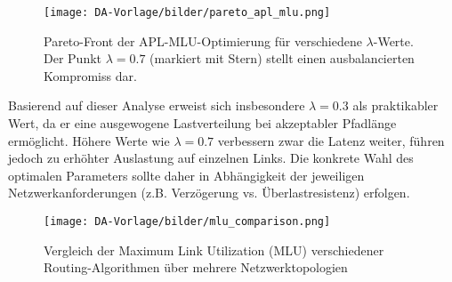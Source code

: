 \begin{figure}[htbp]
    \centering
    \texttt{[image: DA-Vorlage/bilder/pareto\_apl\_mlu.png]}
    \caption{Pareto-Front der APL-MLU-Optimierung für verschiedene $\lambda$-Werte. Der Punkt $\lambda = 0.7$ (markiert mit Stern) stellt einen ausbalancierten Kompromiss dar.}
    \label{fig:pareto_apl_mlu}
\end{figure}

Basierend auf dieser Analyse erweist sich insbesondere $\lambda = 0.3$ als praktikabler Wert, da er eine ausgewogene Lastverteilung bei akzeptabler Pfadlänge ermöglicht. Höhere Werte wie $\lambda = 0.7$ verbessern zwar die Latenz weiter, führen jedoch zu erhöhter Auslastung auf einzelnen Links. Die konkrete Wahl des optimalen Parameters sollte daher in Abhängigkeit der jeweiligen Netzwerkanforderungen (z.B. Verzögerung vs. Überlastresistenz) erfolgen.
\begin{figure}[htbp]
    \centering
    \texttt{[image: DA-Vorlage/bilder/mlu\_comparison.png]}
    \caption{Vergleich der Maximum Link Utilization (MLU) verschiedener Routing-Algorithmen über mehrere Netzwerktopologien }
    \label{fig:mlu_synthetic}
\end{figure}

